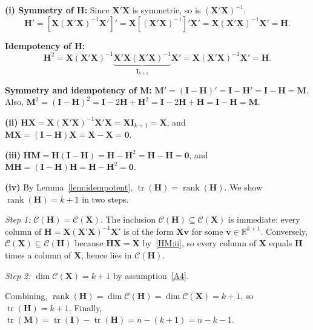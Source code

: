 \documentclass[12pt,a4paper]{article}
\makeatletter
\theoremstyle{definition}
\renewenvironment{proof}[1][\proofname]{\par
  \pushQED{\qed}%
  \normalfont \topsep6\p@\@plus6\p@\relax
  \trivlist
  \item[\hskip\labelsep\bfseries #1\@addpunct{.}]\ignorespaces
}{%
  \popQED\endtrivlist\@endpefalse
}
\DeclareMathOperator\tr{tr}
\DeclareMathOperator\rank{rank}
\newcommand{\bX}{\mathbf{X}}
\newcommand{\bI}{\mathbf{I}}
\newcommand{\bH}{\mathbf{H}}
\newcommand{\bM}{\mathbf{M}}
\newcommand{\bzero}{\mathbf{0}}
\newcommand{\bv}{\mathbf{v}}
\newcommand{\Real}{\mathbb{R}}
\newcommand{\calC}{\mathcal{C}}
\makeatother
\begin{document}
\begin{proof}
\textbf{(i) Symmetry of $\bH$:} Since $\bX'\bX$ is symmetric, so is $(\bX'\bX)^{-1}$:
\[
\bH' = [\bX(\bX'\bX)^{-1}\bX']' = \bX[(\bX'\bX)^{-1}]'\bX' = \bX(\bX'\bX)^{-1}\bX' = \bH.
\]

\textbf{Idempotency of $\bH$:}
\[
\bH^2 = \bX(\bX'\bX)^{-1}\underbrace{\bX'\bX(\bX'\bX)^{-1}}_{\bI_{k+1}}\bX' = \bX(\bX'\bX)^{-1}\bX' = \bH.
\]

\textbf{Symmetry and idempotency of $\bM$:} $\bM' = (\bI - \bH)' = \bI - \bH' = \bI - \bH = \bM$. Also, $\bM^2 = (\bI - \bH)^2 = \bI - 2\bH + \bH^2 = \bI - 2\bH + \bH = \bI - \bH = \bM$.

\textbf{(ii)} $\bH\bX = \bX(\bX'\bX)^{-1}\bX'\bX = \bX\bI_{k+1} = \bX$, and $\bM\bX = (\bI - \bH)\bX = \bX - \bX = \bzero$.

\textbf{(iii)} $\bH\bM = \bH(\bI - \bH) = \bH - \bH^2 = \bH - \bH = \bzero$, and $\bM\bH = (\bI - \bH)\bH = \bH - \bH^2 = \bzero$.

\textbf{(iv)} By Lemma~\ref{lem:idempotent}, $\tr(\bH) = \rank(\bH)$. We show $\rank(\bH) = k + 1$ in two steps.

\emph{Step 1:} $\calC(\bH) = \calC(\bX)$. The inclusion $\calC(\bH) \subseteq \calC(\bX)$ is immediate: every column of $\bH = \bX(\bX'\bX)^{-1}\bX'$ is of the form $\bX\bv$ for some $\bv \in \Real^{k+1}$. Conversely, $\calC(\bX) \subseteq \calC(\bH)$ because $\bH\bX = \bX$ by~\ref{HM:ii}, so every column of $\bX$ equals $\bH$ times a column of $\bX$, hence lies in $\calC(\bH)$.

\emph{Step 2:} $\dim\calC(\bX) = k + 1$ by assumption~\ref{A4}.

Combining, $\rank(\bH) = \dim\calC(\bH) = \dim\calC(\bX) = k + 1$, so $\tr(\bH) = k + 1$. Finally, $\tr(\bM) = \tr(\bI) - \tr(\bH) = n - (k + 1) = n - k - 1$.
\end{proof}
\end{document}
